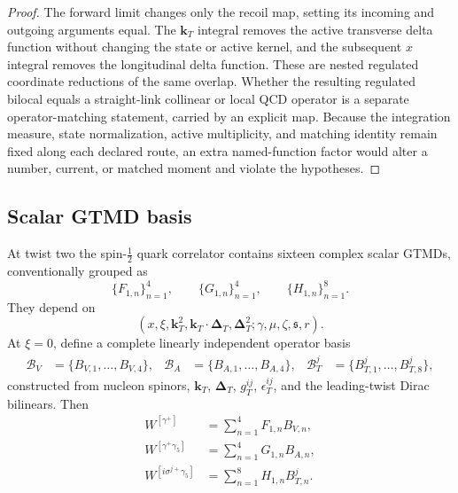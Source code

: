 \documentclass[11pt]{article}
\newcommand{\kT}{\bm{k}_{T}}
\newcommand{\DT}{\bm{\Delta}_{T}}
\newcommand{\cB}{\mathcal B}
\begin{document}
\begin{proof}
The forward limit changes only the recoil map, setting its incoming and
outgoing arguments equal.  The \(\kT\) integral removes the active transverse
delta function without changing the state or active kernel, and the
subsequent \(x\) integral removes the longitudinal delta function.  These are
nested regulated coordinate reductions of the same overlap.  Whether the
resulting regulated bilocal equals a straight-link collinear or local QCD
operator is a separate operator-matching statement, carried by an explicit
map.  Because the integration measure, state normalization, active
multiplicity, and matching identity remain fixed along each declared route,
an extra named-function factor would alter a number, current, or matched
moment and violate the hypotheses.
\end{proof}

\subsection{Scalar GTMD basis}
\label{sec:quark-basis}

At twist two the spin-\(\tfrac12\) quark correlator contains sixteen complex
scalar GTMDs, conventionally grouped as \cite{Meissner2009,LorcePasquini2013}
\begin{equation}
 \{F_{1,n}\}_{n=1}^4,
 \qquad
 \{G_{1,n}\}_{n=1}^4,
 \qquad
 \{H_{1,n}\}_{n=1}^8.
\label{eq:sixteen-quark-gtmds}
\end{equation}
They depend on
\begin{equation}
 \left(x,\xi,\kT^2,\kT\cdot\DT,\DT^2;\gamma,\mu,\zeta,\mathfrak s,r\right).
\label{eq:gtmd-scalar-arguments}
\end{equation}
At \(\xi=0\), define a complete linearly independent operator basis
\begin{align}
 \cB_V&=\{B_{V,1},\ldots,B_{V,4}\},
 &\cB_A&=\{B_{A,1},\ldots,B_{A,4}\},
 &\cB_T^j&=\{B_{T,1}^j,\ldots,B_{T,8}^j\},
\label{eq:quark-bases}
\end{align}
constructed from nucleon spinors, \(\kT\), \(\DT\),
\(g_T^{ij}\), \(\epsilon_T^{ij}\), and the leading-twist Dirac bilinears.
Then
\begin{align}
 W^{[\gamma^+]}&=\sum_{n=1}^4F_{1,n}B_{V,n},
\label{eq:vector-basis-expansion}\\
 W^{[\gamma^+\gamma_5]}&=\sum_{n=1}^4G_{1,n}B_{A,n},
\label{eq:axial-basis-expansion}\\
 W^{[i\sigma^{j+}\gamma_5]}&=\sum_{n=1}^8H_{1,n}B_{T,n}^j.
\label{eq:tensor-basis-expansion}
\end{align}
\end{document}

